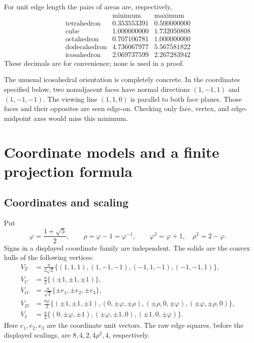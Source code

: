 \documentclass[11pt,a4paper]{article}
\newcommand{\ph}{\varphi}
\newcommand{\rr}{\rho}
\begin{document}
For unit edge length the pairs of areas are, respectively,
\[
\begin{array}{c|cc}
 &\text{minimum}&\text{maximum}\\\hline
\text{tetrahedron}&0.353553391&0.500000000\\
\text{cube}&1.000000000&1.732050808\\
\text{octahedron}&0.707106781&1.000000000\\
\text{dodecahedron}&4.736067977&5.567581822\\
\text{icosahedron}&2.069737599&2.267283942
\end{array}
\]
These decimals are for convenience; none is used in a proof.

The unusual icosahedral orientation is completely concrete. In the coordinates specified below, two nonadjacent faces have normal directions $(1,-1,1)$ and $(1,-1,-1)$. The viewing line $(1,1,0)$ is parallel to both face planes. Those faces and their opposites are seen edge-on. Checking only face, vertex, and edge-midpoint axes would miss this minimum.

\section{Coordinate models and a finite projection formula}\label{sec:geometry}

\subsection{Coordinates and scaling}
Put
\[
 \ph=\frac{1+\sqrt5}{2},\qquad \rr=\ph-1=\ph^{-1},\qquad
 \ph^2=\ph+1,\quad \rr^2=2-\ph.
\]
Signs in a displayed coordinate family are independent. The solids are the convex hulls of the following vertices:
\begin{align}
 V_T&=\frac{a}{2\sqrt2}\{(1,1,1),(1,-1,-1),(-1,1,-1),(-1,-1,1)\},\label{eq:tetvertices}\\
 V_C&=\frac a2\{(\pm1,\pm1,\pm1)\},\label{eq:cubevertices}\\
 V_O&=\frac a{\sqrt2}\{\pm e_1,\pm e_2,\pm e_3\},\label{eq:octvertices}\\
 V_D&=\frac{a\ph}{2}\{(\pm1,\pm1,\pm1),(0,\pm\ph,\pm\rr),
 (\pm\rr,0,\pm\ph),(\pm\ph,\pm\rr,0)\},\label{eq:dodecvertices}\\
 V_I&=\frac a2\{(0,\pm\ph,\pm1),(\pm\ph,\pm1,0),(\pm1,0,\pm\ph)\}.
 \label{eq:icovertices}
\end{align}
Here $e_1,e_2,e_3$ are the coordinate unit vectors. The raw edge squares, before the displayed scalings, are $8,4,2,4\rr^2,4$, respectively.
\end{document}
